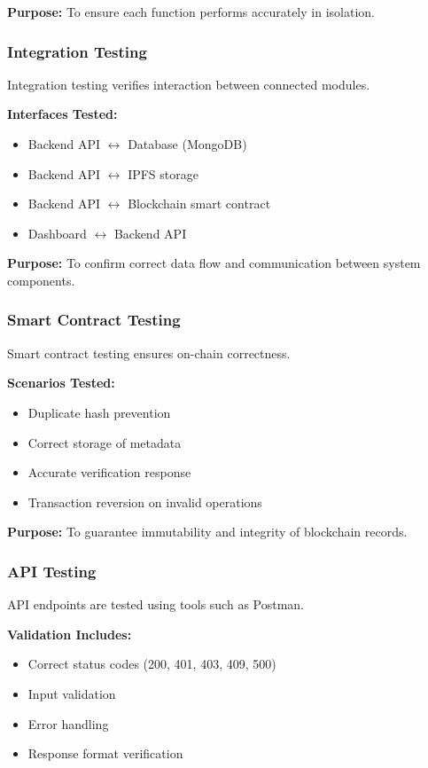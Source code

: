 \documentclass[12pt]{article}
\begin{document}
\textbf{Purpose:}  
To ensure each function performs accurately in isolation.

\subsubsection{Integration Testing}

Integration testing verifies interaction between connected modules.

\textbf{Interfaces Tested:}
\begin{itemize}
\item Backend API $\leftrightarrow$ Database (MongoDB)
\item Backend API $\leftrightarrow$ IPFS storage
\item Backend API $\leftrightarrow$ Blockchain smart contract
\item Dashboard $\leftrightarrow$ Backend API
\end{itemize}

\textbf{Purpose:}  
To confirm correct data flow and communication between system components.

\subsubsection{Smart Contract Testing}

Smart contract testing ensures on-chain correctness.

\textbf{Scenarios Tested:}
\begin{itemize}
\item Duplicate hash prevention
\item Correct storage of metadata
\item Accurate verification response
\item Transaction reversion on invalid operations
\end{itemize}

\textbf{Purpose:}  
To guarantee immutability and integrity of blockchain records.

\subsubsection{API Testing}

API endpoints are tested using tools such as Postman.

\textbf{Validation Includes:}
\begin{itemize}
\item Correct status codes (200, 401, 403, 409, 500)
\item Input validation
\item Error handling
\item Response format verification
\end{itemize}
\end{document}
